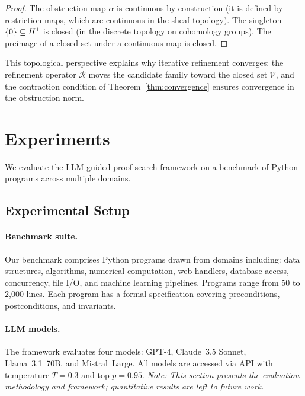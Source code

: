 \documentclass[11pt]{article}
\newcommand{\RefineOp}{\mathcal{R}}
\begin{document}
\begin{proof}
The obstruction map $\alpha$ is continuous by construction (it is
defined by restriction maps, which are continuous in the sheaf
topology).  The singleton $\{0\} \subseteq H^{1}$ is closed
(in the discrete topology on cohomology groups).  The preimage of
a closed set under a continuous map is closed.
\end{proof}

This topological perspective explains why iterative refinement
converges: the refinement operator $\RefineOp$ moves the candidate
family toward the closed set $\mathcal{V}$, and the contraction
condition of Theorem~\ref{thm:convergence} ensures convergence in
the obstruction norm.


\section{Experiments}\label{sec:experiments}

We evaluate the LLM-guided proof search framework on a benchmark of
Python programs across multiple domains.

\subsection{Experimental Setup}\label{subsec:setup}

\paragraph{Benchmark suite.}
Our benchmark comprises Python programs drawn
from domains including: data structures, algorithms,
numerical computation, web handlers, database access, concurrency,
file I/O, and machine learning pipelines.  Programs range from
50 to 2{,}000 lines.  Each program has a formal
specification covering preconditions, postconditions, and invariants.

\paragraph{LLM models.}
The framework evaluates four models: GPT-4, Claude~3.5 Sonnet,
Llama~3.1~70B, and Mistral~Large.  All models are accessed via API
with temperature $T = 0.3$ and top-$p = 0.95$.
\emph{Note: This section presents the evaluation methodology and framework; quantitative results are left to future work.}
\end{document}
